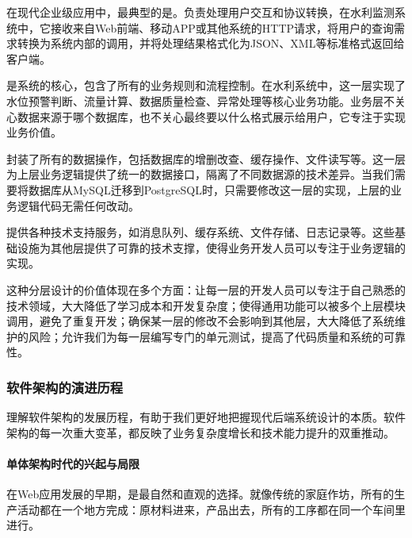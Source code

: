 在现代企业级应用中，最典型的是。负责处理用户交互和协议转换，在水利监测系统中，它接收来自Web前端、移动APP或其他系统的HTTP请求，将用户的查询需求转换为系统内部的调用，并将处理结果格式化为JSON、XML等标准格式返回给客户端。

是系统的核心，包含了所有的业务规则和流程控制。在水利系统中，这一层实现了水位预警判断、流量计算、数据质量检查、异常处理等核心业务功能。业务层不关心数据来源于哪个数据库，也不关心最终要以什么格式展示给用户，它专注于实现业务价值。

封装了所有的数据操作，包括数据库的增删改查、缓存操作、文件读写等。这一层为上层业务逻辑提供了统一的数据接口，隔离了不同数据源的技术差异。当我们需要将数据库从MySQL迁移到PostgreSQL时，只需要修改这一层的实现，上层的业务逻辑代码无需任何改动。

提供各种技术支持服务，如消息队列、缓存系统、文件存储、日志记录等。这些基础设施为其他层提供了可靠的技术支撑，使得业务开发人员可以专注于业务逻辑的实现。

这种分层设计的价值体现在多个方面：让每一层的开发人员可以专注于自己熟悉的技术领域，大大降低了学习成本和开发复杂度；使得通用功能可以被多个上层模块调用，避免了重复开发；确保某一层的修改不会影响到其他层，大大降低了系统维护的风险；允许我们为每一层编写专门的单元测试，提高了代码质量和系统的可靠性。

\hypertarget{ux8f6fux4ef6ux67b6ux6784ux7684ux6f14ux8fdbux5386ux7a0b}{%
\subsubsection{软件架构的演进历程}\label{ux8f6fux4ef6ux67b6ux6784ux7684ux6f14ux8fdbux5386ux7a0b}}

理解软件架构的发展历程，有助于我们更好地把握现代后端系统设计的本质。软件架构的每一次重大变革，都反映了业务复杂度增长和技术能力提升的双重推动。

\hypertarget{ux5355ux4f53ux67b6ux6784ux65f6ux4ee3ux7684ux5174ux8d77ux4e0eux5c40ux9650}{%
\paragraph{单体架构时代的兴起与局限}\label{ux5355ux4f53ux67b6ux6784ux65f6ux4ee3ux7684ux5174ux8d77ux4e0eux5c40ux9650}}

在Web应用发展的早期，是最自然和直观的选择。就像传统的家庭作坊，所有的生产活动都在一个地方完成：原材料进来，产品出去，所有的工序都在同一个车间里进行。

